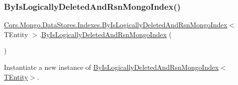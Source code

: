 \subsubsection{\texorpdfstring{By\+Is\+Logically\+Deleted\+And\+Rsn\+Mongo\+Index()}{ByIsLogicallyDeletedAndRsnMongoIndex()}}
{\footnotesize\ttfamily \hyperlink{classCqrs_1_1Mongo_1_1DataStores_1_1Indexes_1_1ByIsLogicallyDeletedAndRsnMongoIndex}{Cqrs.\+Mongo.\+Data\+Stores.\+Indexes.\+By\+Is\+Logically\+Deleted\+And\+Rsn\+Mongo\+Index}$<$ T\+Entity $>$.\hyperlink{classCqrs_1_1Mongo_1_1DataStores_1_1Indexes_1_1ByIsLogicallyDeletedAndRsnMongoIndex}{By\+Is\+Logically\+Deleted\+And\+Rsn\+Mongo\+Index} (\begin{DoxyParamCaption}{ }\end{DoxyParamCaption})\hspace{0.3cm}{\ttfamily [protected]}}



Instantiate a new instance of \hyperlink{classCqrs_1_1Mongo_1_1DataStores_1_1Indexes_1_1ByIsLogicallyDeletedAndRsnMongoIndex_a41c3a6c01a59bba485893fab8518df09_a41c3a6c01a59bba485893fab8518df09}{By\+Is\+Logically\+Deleted\+And\+Rsn\+Mongo\+Index$<$\+T\+Entity$>$}. 

